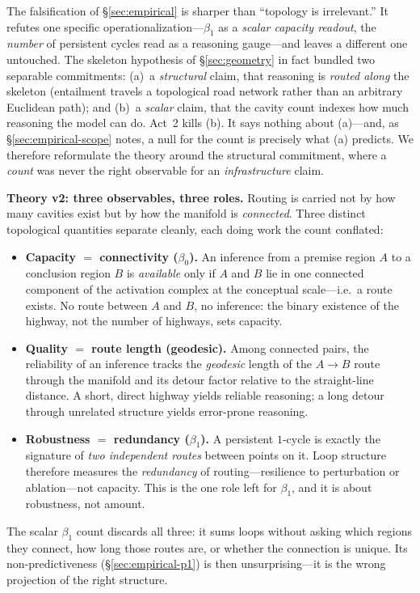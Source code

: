 \documentclass{article}
\begin{document}
The falsification of \S\ref{sec:empirical} is sharper than ``topology is irrelevant.'' It refutes one
specific operationalization---$\beta_1$ as a \emph{scalar capacity readout}, the \emph{number} of
persistent cycles read as a reasoning gauge---and leaves a different one untouched. The skeleton
hypothesis of \S\ref{sec:geometry} in fact bundled two separable commitments: (a)~a \emph{structural}
claim, that reasoning is \emph{routed along} the skeleton (entailment travels a topological road
network rather than an arbitrary Euclidean path); and (b)~a \emph{scalar} claim, that the cavity
count indexes how much reasoning the model can do. Act~2 kills (b). It says nothing about (a)---and,
as \S\ref{sec:empirical-scope} notes, a null for the count is precisely what (a) predicts. We
therefore reformulate the theory around the structural commitment, where a \emph{count} was never the
right observable for an \emph{infrastructure} claim.

\medskip
\noindent\textbf{Theory v2: three observables, three roles.} Routing is carried not by how many
cavities exist but by how the manifold is \emph{connected}. Three distinct topological quantities
separate cleanly, each doing work the count conflated:
\begin{itemize}
  \item \textbf{Capacity $=$ connectivity ($\beta_0$).} An inference from a premise region $A$ to a
  conclusion region $B$ is \emph{available} only if $A$ and $B$ lie in one connected component of the
  activation complex at the conceptual scale---i.e.\ a route exists. No route between $A$ and $B$, no
  inference: the binary existence of the highway, not the number of highways, sets capacity.
  \item \textbf{Quality $=$ route length (geodesic).} Among connected pairs, the reliability of an
  inference tracks the \emph{geodesic} length of the $A\!\to\!B$ route through the manifold and its
  detour factor relative to the straight-line distance. A short, direct highway yields reliable
  reasoning; a long detour through unrelated structure yields error-prone reasoning.
  \item \textbf{Robustness $=$ redundancy ($\beta_1$).} A persistent $1$-cycle is exactly the
  signature of \emph{two independent routes} between points on it. Loop structure therefore measures
  the \emph{redundancy} of routing---resilience to perturbation or ablation---not capacity. This is
  the one role left for $\beta_1$, and it is about robustness, not amount.
\end{itemize}
The scalar $\beta_1$ count discards all three: it sums loops without asking which regions they
connect, how long those routes are, or whether the connection is unique. Its non-predictiveness
(\S\ref{sec:empirical-p1}) is then unsurprising---it is the wrong projection of the right structure.
\end{document}
